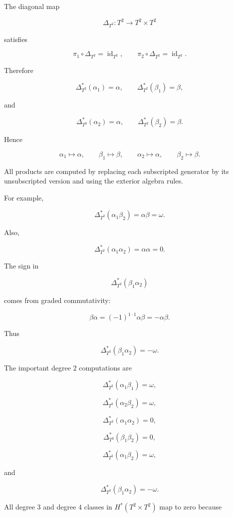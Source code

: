 \documentclass[12pt,a4paper]{article}
\theoremstyle{notespace}
\begin{document}
The diagonal map

\[
\Delta_{T^2}:T^2\to T^2\times T^2
\]

satisfies

\[
\pi_1\circ\Delta_{T^2}=\operatorname{id}_{T^2},
\qquad
\pi_2\circ\Delta_{T^2}=\operatorname{id}_{T^2}.
\]

Therefore

\[
\Delta_{T^2}^*(\alpha_1)=\alpha,
\qquad
\Delta_{T^2}^*(\beta_1)=\beta,
\]

and

\[
\Delta_{T^2}^*(\alpha_2)=\alpha,
\qquad
\Delta_{T^2}^*(\beta_2)=\beta.
\]

Hence

\[
\boxed{
	\alpha_1\mapsto \alpha,
	\qquad
	\beta_1\mapsto \beta,
	\qquad
	\alpha_2\mapsto \alpha,
	\qquad
	\beta_2\mapsto \beta.
}
\]

All products are computed by replacing each subscripted generator by its unsubscripted version and using the exterior algebra rules.

For example,

\[
\Delta_{T^2}^*(\alpha_1\beta_2)
=
\alpha\beta
=
\omega.
\]

Also,

\[
\Delta_{T^2}^*(\alpha_1\alpha_2)
=
\alpha\alpha
=
0.
\]

The sign in

\[
\Delta_{T^2}^*(\beta_1\alpha_2)
\]

comes from graded commutativity:

\[
\beta\alpha
=
(-1)^{1\cdot 1}\alpha\beta
=
-\alpha\beta.
\]

Thus

\[
\Delta_{T^2}^*(\beta_1\alpha_2)
=
-\omega.
\]

The important degree \(2\) computations are

\[
\boxed{
	\Delta_{T^2}^*(\alpha_1\beta_1)=\omega,
}
\]

\[
\boxed{
	\Delta_{T^2}^*(\alpha_2\beta_2)=\omega,
}
\]

\[
\boxed{
	\Delta_{T^2}^*(\alpha_1\alpha_2)=0,
}
\]

\[
\boxed{
	\Delta_{T^2}^*(\beta_1\beta_2)=0,
}
\]

\[
\boxed{
	\Delta_{T^2}^*(\alpha_1\beta_2)=\omega,
}
\]

and

\[
\boxed{
	\Delta_{T^2}^*(\beta_1\alpha_2)=-\omega.
}
\]

All degree \(3\) and degree \(4\) classes in \(H^*(T^2\times T^2)\) map to zero because
\end{document}
